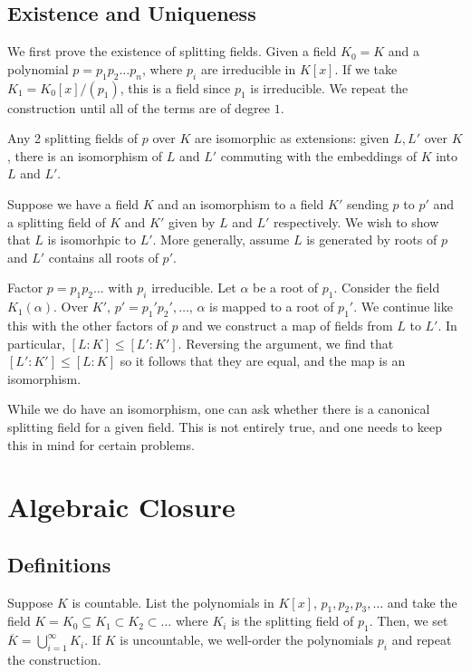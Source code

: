 \documentclass[11pt]{scrartcl}
\begin{document}
\subsection{Existence and Uniqueness}
We first prove the existence of splitting fields.  Given a field $K_0 = K$ and a polynomial $p = p_1p_2 \dots p_n$, where $p_i$ are irreducible in $K[x]$.  If we take $K_1 = K_0[x]/(p_1)$, this is a field since $p_1$ is irreducible.  We repeat the construction until all of the terms are of degree $1$.  

Any 2 splitting fields of $p$ over $K$ are isomorphic as extensions: given $L, L'$ over $K$, there is an isomorphism of $L$ and $L'$ commuting with the embeddings of $K$ into $L$ and $L'$.

Suppose we have a field $K$ and an isomorphism to a field $K'$ sending $p$ to $p'$ and a splitting field of $K$ and $K'$ given by $L$ and $L'$ respectively.  We wish to show that $L$ is isomorhpic to $L'$.  More generally, assume $L$ is generated by roots of $p$ and $L'$ contains all roots of $p'$.

Factor $p = p_1 p_2 \dots$ with $p_i$ irreducible.  Let $\alpha$ be a root of $p_1$.  Consider the field $K_1(\alpha)$.  Over $K'$, $p' = p_1'p_2', \dots$, $\alpha$ is mapped to a root of $p_1'$.  We continue like this with the other factors of $p$ and we construct a map of fields from $L$ to $L'$.  In particular, $[L:K] \le [L': K']$. Reversing the argument, we find that $[L':K'] \le [L:K]$ so it follows that they are equal, and the map is an isomorphism.  

While we do have an isomorphism, one can ask whether there is a canonical splitting field for a given field.  This is not entirely true, and one needs to keep this in mind for certain problems.
\pagebreak
\section{Algebraic Closure}
\subsection{Definitions}

Suppose $K$ is countable.  List the polynomials in $K[x]$, $p_1, p_2, p_3, \dots$ and take the field $K = K_0 \subseteq K_1 \subset K_2 \subset \dots$ where $K_i$ is the splitting field of $p_1$.  Then, we set $\overline{K} = \bigcup_{i=1}^\infty K_i$.  If $K$ is uncountable, we well-order the polynomials $p_i$ and repeat the construction.
\end{document}
